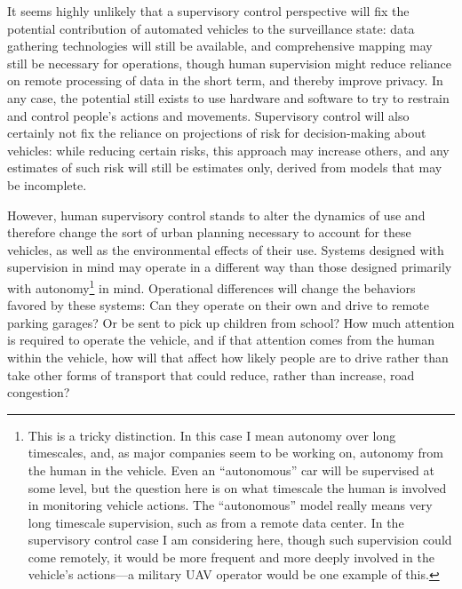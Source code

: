 It seems highly unlikely that a supervisory control perspective will
fix the potential contribution of automated vehicles to the
surveillance state:  data gathering technologies will still be
available, and comprehensive mapping may still be necessary for
operations, though human supervision might reduce
reliance on remote processing of data in the short term, and thereby
improve privacy. In 
any case, the potential still exists to use hardware 
and software to try to restrain and control people's actions and
movements. Supervisory control will also certainly not fix the
reliance on projections of risk for decision-making about vehicles:
while reducing certain risks, this approach may increase others, and
any estimates of such risk will still be estimates only, derived from
models that may be incomplete.

However, human supervisory control stands to alter the dynamics of use
and therefore change the sort of urban planning necessary to account
for these vehicles, as well as the environmental effects of their use.
Systems designed with supervision in mind may operate in a different
way than those designed primarily with autonomy\footnote{This is a
  tricky distinction. In this case
  I mean autonomy over long timescales, and, as major companies seem
  to be working on, autonomy from the human in the vehicle. Even an
  ``autonomous'' car will be supervised at some level, but the
  question here is on what timescale the human is involved in
  monitoring vehicle actions. The ``autonomous'' model really means very
  long timescale supervision, such as from a remote data center. In
  the supervisory control case I am considering here, though such
  supervision could come remotely, it would be more frequent and more
  deeply involved in the vehicle's actions---a military UAV operator
  would be one example of this.} in mind. Operational
differences will change the behaviors favored by these systems:  Can
they operate on their own and drive to remote parking garages? Or be
sent to pick up children from school? How much attention is required
to operate the vehicle, and if that attention comes from the human
within the vehicle, how will that affect how likely people are to
drive rather than take other forms of transport that could reduce,
rather than increase, road congestion? 

